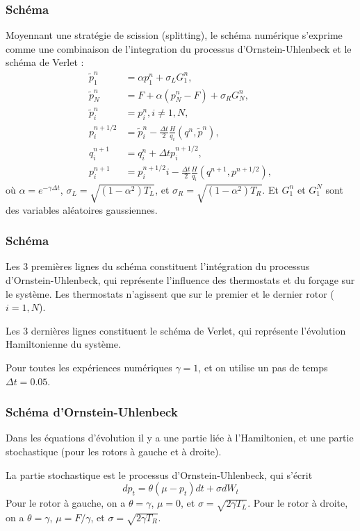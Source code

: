 \begin{frame}

    \frametitle{Schéma}

    Moyennant une stratégie de scission (splitting), le schéma
    numérique s'exprime comme une combinaison de l'integration du
    processus d'Ornstein-Uhlenbeck et le schéma de Verlet :
    \begin{align*}
        \tilde p_1^n &= \alpha p_1^n + \sigma_L G_1^n, \\
        \tilde p_N^n &= F + \alpha (p_N^n - F) + \sigma_R G_N^n, \\
        \tilde p_i^n &= p_i^n, i \neq 1,N, \\
        p_i^{n+1/2} &= \tilde p_i^n - \frac{\Delta t}{2}
        \frac{H}{q_i} (q^n, \tilde p^n), \\
        q_i^{n+1} &= q_i^n+ \Delta t p_i^{n+1/2}, \\
        p_i^{n+1} &= p_i^{n+1/2} i - \frac{\Delta t}{2}
        \frac{H}{q_i} (q^{n+1}, p^{n+1/2}),
    \end{align*}
    où $\alpha = e^{-\gamma \Delta t}$,
    $\sigma_L = \sqrt{(1 - \alpha^2)T_L}$,
    et $\sigma_R = \sqrt{(1 - \alpha^2)T_R}$.
    Et $G_1^n$ et $G_1^N$ sont des variables aléatoires gaussiennes.

\end{frame}

\begin{frame}

    \frametitle{Schéma}

    Les 3 premières lignes du schéma constituent l'intégration
    du processus d'Ornstein-Uhlenbeck, qui représente l'influence
    des thermostats et du forçage sur le système. Les thermostats
    n'agissent que sur le premier et le dernier rotor ($i = 1,N$).

    Les 3 dernières lignes constituent le schéma de Verlet, qui
    représente l'évolution Hamiltonienne du système.

    Pour toutes les expériences numériques $\gamma = 1$, et on
    utilise un pas de temps $\Delta t = 0.05$.

\end{frame}





\begin{frame}

    \frametitle{Schéma d'Ornstein-Uhlenbeck}

    Dans les équations d'évolution il y a une partie liée à l'Hamiltonien,
    et une partie stochastique (pour les rotors à gauche et à droite).

    La partie stochastique est le processus d'Ornstein-Uhlenbeck, qui
    s'écrit
    \[dp_t = \theta (\mu - p_t) dt + \sigma dW_t\]
    Pour le rotor à gauche, on a
    $\theta = \gamma$, $\mu = 0$, et $\sigma = \sqrt{2 \gamma T_L}$.
    Pour le rotor à droite, on a
    $\theta = \gamma$, $\mu = F / \gamma$, et $\sigma = \sqrt{2 \gamma T_R}$.

\end{frame}






